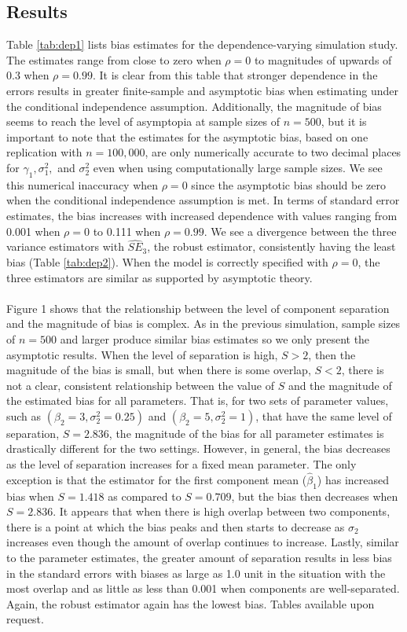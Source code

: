 \documentclass[10pt]{article}
\begin{document}
\subsection{Results}
Table \ref{tab:dep1} lists bias estimates for the dependence-varying simulation study. The estimates range from close to zero when $\rho=0$ to magnitudes of upwards of 0.3 when $\rho = 0.99$. It is clear from this table that stronger dependence in the errors results in greater finite-sample and asymptotic bias when estimating under the conditional independence assumption. Additionally, the magnitude of bias seems to reach the level of asymptopia at sample sizes of $n=500$, but it is important to note that the estimates for the asymptotic bias, based on one replication with $n=100,000$, are only numerically accurate to two decimal places for $\gamma_{1},\sigma^{2}_{1},$ and $\sigma^{2}_{2}$ even when using computationally large sample sizes. We see this numerical inaccuracy when $\rho=0$ since the asymptotic bias should be zero when the conditional independence assumption is met.  In terms of standard error estimates, the bias increases with increased dependence with values ranging from 0.001 when $\rho=0$ to 0.111 when $\rho = 0.99$. We see a divergence between the three variance estimators with $\widehat{SE}_3$, the robust estimator, consistently having the least bias (Table \ref{tab:dep2}).  When the model is correctly specified with $\rho=0$, the three estimators are similar as supported by asymptotic theory.  \\\\
Figure 1 shows that the relationship between the level of component separation and the magnitude of bias is complex. As in the previous simulation, sample sizes of $n=500$ and larger produce similar bias estimates so we only present the asymptotic results. When the level of separation is high, $S>2$, then the magnitude of the bias is small, but when there is some overlap, $S<2$, there is not a clear, consistent relationship between the value of $S$ and the magnitude of the estimated bias for all parameters. That is, for two sets of parameter values, such as $(\beta_{2}=3,\sigma^{2}_{2}=0.25)$ and $(\beta_{2}=5,\sigma^{2}_{2}=1)$, that have the same level of separation, $S = 2.836$, the magnitude of the bias for all parameter estimates is drastically different for the two settings. However, in general, the bias decreases as the level of separation increases for a fixed mean parameter. The only exception is that the estimator for the first component mean ($\widehat{\beta}_{1}$) has increased bias when $S=1.418$ as compared to $S=0.709$, but the bias then decreases when $S=2.836$. It appears that when there is high overlap between two components, there is a point at which the bias peaks and then starts to decrease as $\sigma_2$ increases even though the amount of overlap continues to increase. Lastly, similar to the parameter estimates, the greater amount of separation results in less bias in the standard errors with biases as large as 1.0 unit in the situation with the most overlap and as little as less than 0.001 when components are well-separated. Again, the robust estimator again has the lowest bias. Tables available upon request. 
\end{document}
